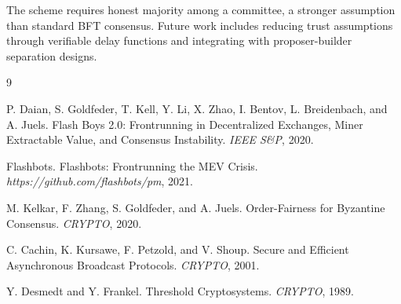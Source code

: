 \documentclass[11pt,a4paper]{article}
\theoremstyle{definition}
\begin{document}
The scheme requires honest majority among a committee, a stronger assumption than standard BFT consensus. Future work includes reducing trust assumptions through verifiable delay functions and integrating with proposer-builder separation designs.


\begin{thebibliography}{9}

P. Daian, S. Goldfeder, T. Kell, Y. Li, X. Zhao, I. Bentov, L. Breidenbach, and A. Juels.
Flash Boys 2.0: Frontrunning in Decentralized Exchanges, Miner Extractable Value, and Consensus Instability.
\textit{IEEE S\&P}, 2020.

Flashbots.
Flashbots: Frontrunning the MEV Crisis.
\textit{https://github.com/flashbots/pm}, 2021.

M. Kelkar, F. Zhang, S. Goldfeder, and A. Juels.
Order-Fairness for Byzantine Consensus.
\textit{CRYPTO}, 2020.

C. Cachin, K. Kursawe, F. Petzold, and V. Shoup.
Secure and Efficient Asynchronous Broadcast Protocols.
\textit{CRYPTO}, 2001.

Y. Desmedt and Y. Frankel.
Threshold Cryptosystems.
\textit{CRYPTO}, 1989.

\end{thebibliography}
\end{document}
